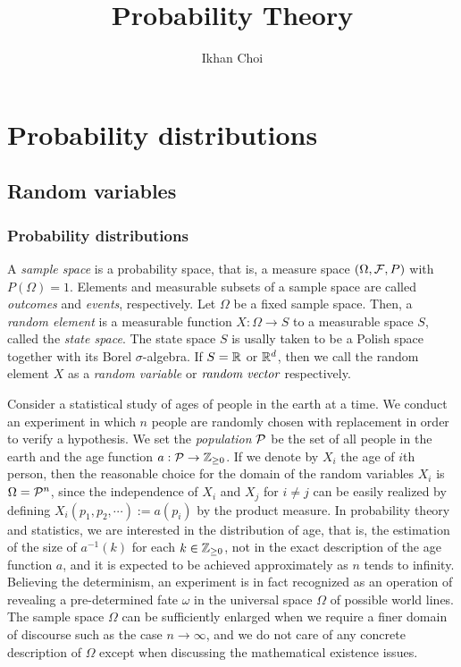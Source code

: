 \documentclass{../../large}
\begin{document}
\title{Probability Theory}
\author{Ikhan Choi}
\maketitle
\tableofcontents


\part{Probability distributions}


\chapter{Random variables}

\section{Probability distributions}

\begin{prb}
A \emph{sample space} is a probability space, that is, a measure space $(\Omega,\mathcal{F},P)$ with $P(\Omega)=1$.
Elements and measurable subsets of a sample space are called \emph{outcomes} and \emph{events}, respectively.
Let $\Omega$ be a fixed sample space.
Then, a \emph{random element} is a measurable function $X:\Omega\to S$ to a measurable space $S$, called the \emph{state space}.
The state space $S$ is usally taken to be a Polish space together with its Borel $\sigma$-algebra.
If $S=\mathbb{R}$ or $\mathbb{R}^d$, then we call the random element $X$ as a \emph{random variable} or $\emph{random vector}$ respectively.

Consider a statistical study of ages of people in the earth at a time.
We conduct an experiment in which $n$ people are randomly chosen with replacement in order to verify a hypothesis.
We set the \emph{population} $\mathcal{P}$ be the set of all people in the earth and the age function $a:\mathcal{P}\to\mathbb{Z}_{\ge0}$.
If we denote by $X_i$ the age of $i$th person, then the reasonable choice for the domain of the random variables $X_i$ is $\Omega=\mathcal{P}^n$, since the independence of $X_i$ and $X_j$ for $i\ne j$ can be easily realized by defining $X_i(p_1,p_2,\cdots):=a(p_i)$ by the product measure.
In probability theory and statistics, we are interested in the distribution of age, that is, the estimation of the size of $a^{-1}(k)$ for each $k\in\mathbb{Z}_{\ge0}$, not in the exact description of the age function $a$, and it is expected to be achieved approximately as $n$ tends to infinity.
Believing the determinism, an experiment is in fact recognized as an operation of revealing a pre-determined fate $\omega$ in the universal space $\Omega$ of possible world lines.
The sample space $\Omega$ can be sufficiently enlarged when we require a finer domain of discourse such as the case $n\to\infty$, and we do not care of any concrete description of $\Omega$ except when discussing the mathematical existence issues.
\end{prb}
\end{document}
